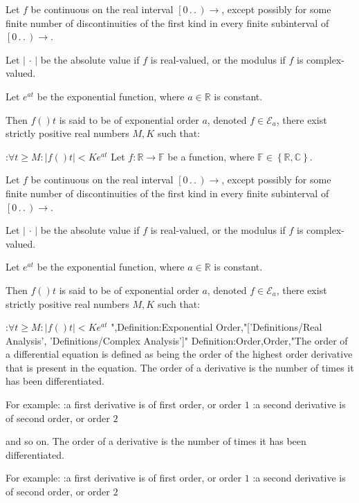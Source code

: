 Let $f$ be continuous on the real interval $\left[ 0 \,.\,.\,   \right)\to$, except possibly for some finite number of discontinuities of the first kind in every finite subinterval of $\left[ 0 \,.\,.\,   \right)\to$.



Let  $\left\lvert \, \cdot \, \right\rvert$ be the absolute value if $f$ is real-valued, or the modulus if $f$ is complex-valued.

Let $e^{a t}$ be the exponential function, where $a \in \mathbb R$ is constant.


Then $f \left(   \right)t$ is said to be of exponential order $a$, denoted $f \in \mathcal E_a$,  there exist strictly positive real numbers $M, K$ such that:

:$\forall t \ge M: \left\lvert f \left(   \right)t \right\rvert < K e^{a t}$
Let $f: \mathbb R \to \mathbb F$ be a function, where $\mathbb F \in \left\lbrace \mathbb R, \mathbb C \right\rbrace$.

Let $f$ be continuous on the real interval $\left[ 0 \,.\,.\,   \right)\to$, except possibly for some finite number of discontinuities of the first kind in every finite subinterval of $\left[ 0 \,.\,.\,   \right)\to$.



Let  $\left\lvert \, \cdot \, \right\rvert$ be the absolute value if $f$ is real-valued, or the modulus if $f$ is complex-valued.

Let $e^{a t}$ be the exponential function, where $a \in \mathbb R$ is constant.


Then $f \left(   \right)t$ is said to be of exponential order $a$, denoted $f \in \mathcal E_a$,  there exist strictly positive real numbers $M, K$ such that:

:$\forall t \ge M: \left\lvert f \left(   \right)t \right\rvert < K e^{a t}$
",Definition:Exponential Order,"['Definitions/Real Analysis', 'Definitions/Complex Analysis']"
Definition:Order,Order,"The order of a differential equation is defined as being the order of the highest order derivative that is present in the equation.
The order of a derivative is the number of times it has been differentiated.

For example:
:a first derivative is of first order, or order $1$
:a second derivative is of second order, or order $2$

and so on.
The order of a derivative is the number of times it has been differentiated.

For example:
:a first derivative is of first order, or order $1$
:a second derivative is of second order, or order $2$


